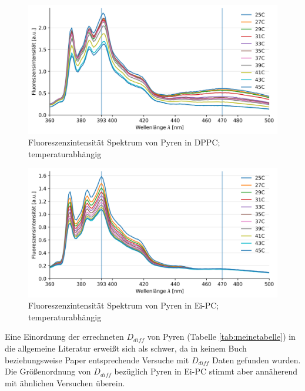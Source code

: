 \begin{figure}[h!]
	\begin{center}
		\begin{minipage}{0,8\textwidth}
			
			\includegraphics[width=\textwidth]{analysis/reports//Temp_Device4.png}
			\caption{Fluoreszenzintensität Spektrum von Pyren in DPPC; temperaturabhängig} 
			\label{Temp_Geraet4} 
		\end{minipage}
	\end{center}
\end{figure}
\begin{figure}[h!]
	\begin{center}
		\begin{minipage}{0,8\textwidth}
			
			\includegraphics[width=\textwidth]{analysis/reports/Temp_Device3.png}
			\caption{Fluoreszenzintensität Spektrum von Pyren in Ei-PC; temperaturabhängig} 
			\label{Temp} 
		\end{minipage}
	\end{center}
\end{figure}
Eine Einordnung der errechneten $D_{diff}$ von Pyren (Tabelle \ref{tab:meinetabelle}) in die allgemeine Literatur erweißt sich als schwer, da in keinem Buch beziehungsweise Paper entsprechende Versuche mit $D_{diff}$ Daten gefunden wurden. Die Größenordnung von $D_{diff}$ bezüglich Pyren in Ei-PC stimmt aber annäherend mit ähnlichen Versuchen überein. \cite{Wu1977} \\\\
